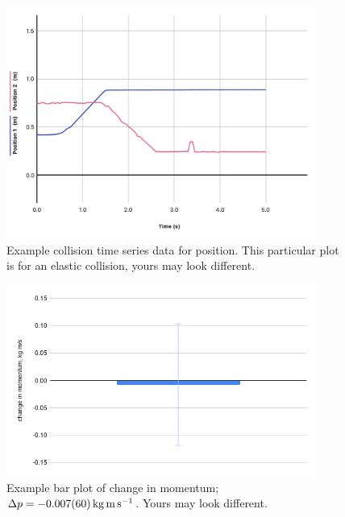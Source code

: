 \documentclass [hw,addpoints,noanswers]{exam}
\begin{document}
\begin{figure}[p]
\begin{center}
\includegraphics[width=4in]{elastic.png}
\end{center}
\caption{Example collision time series data for position. This particular plot is for an elastic collision, yours may look different.}
\label{fig:elastic}
\end{figure}

\begin{figure}[p]
\begin{center}
\includegraphics[width=4in]{dmomentum.png}
\end{center}
\caption{Example bar plot of change in momentum; $\Delta p = \SI{-0.007\pm0.06}{\kilo\gram\meter\per\second}$. Yours may look different.}
\label{fig:momentum-change}
\end{figure}
\end{document}
